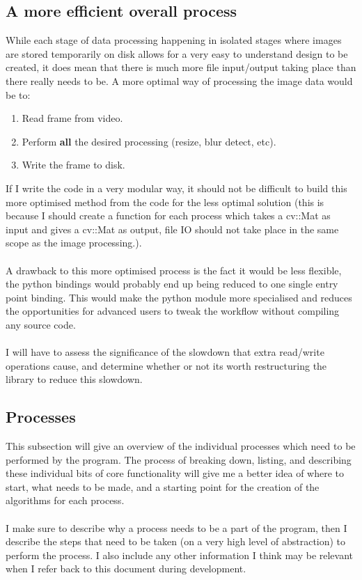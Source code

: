 \documentclass[11pt]{report}
\begin{document}
\subsection{A more efficient overall process}
While each stage of data processing happening in isolated stages where images are stored temporarily on disk allows for a very easy to understand design to be created, it does mean that there is much more file input/output taking place than there really needs to be.
A more optimal way of processing the image data would be to:
\begin{enumerate}
\item Read frame from video.
\item Perform \textbf{all} the desired processing (resize, blur detect, etc).
\item Write the frame to disk.
\end{enumerate}
If I write the code in a very modular way, it should not be difficult to build this more optimised method from the code for the less optimal solution (this is because I should create a function for each process which takes a cv::Mat as input and gives a cv::Mat as output, file IO should not take place in the same scope as the image processing.).\\\\
A drawback to this more optimised process is the fact it would be less flexible, the python bindings would probably end up being reduced to one single entry point binding. This would make the python module more specialised and reduces the opportunities for advanced users to tweak the workflow without compiling any source code.\\\\
I will have to assess the significance of the slowdown that extra read/write operations cause, and determine whether or not its worth restructuring the library to reduce this slowdown.
\subsection{Processes}
This subsection will give an overview of the individual processes which need to be performed by the program. The process of breaking down, listing, and describing these individual bits of core functionality will give me a better idea of where to start, what needs to be made, and a starting point for the creation of the algorithms for each process.\\\\
I make sure to describe why a process needs to be a part of the program, then I describe the steps that need to be taken (on a very high level of abstraction) to perform the process. I also include any other information I think may be relevant when I refer back to this document during development.
\end{document}
